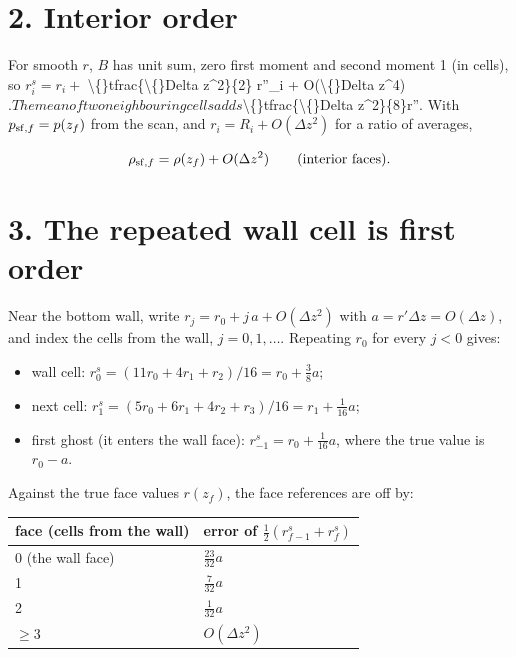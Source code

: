 \documentclass[11pt,a4paper]{article}
\begin{document}
\section*{2. Interior order}

For smooth $r$, $B$ has unit sum, zero first moment and second moment 1 (in cells), so $r^s_i = r_i +$
\textbackslash\{\}tfrac\{\textbackslash\{\}Delta z\textasciicircum{}2\}\{2\} r''\_i + O(\textbackslash\{\}Delta z\textasciicircum{}4)$. The mean of two neighbouring cells adds $\textbackslash\{\}tfrac\{\textbackslash\{\}Delta z\textasciicircum{}2\}\{8\}r''$.$
With $p_{{\rm sf},f} = p(z_f)$ from the scan, and $r_i = R_i + O(\Delta z^2)$ for a ratio of averages,

\begin{equation*}
\rho_{{\rm sf},f} = \rho(z_f) + O(\Delta z^2)\qquad\text{(interior faces)}.
\end{equation*}

\section*{3. The repeated wall cell is first order}

Near the bottom wall, write $r_j = r_0 + j\,a + O(\Delta z^2)$ with $a = r'\Delta z = O(\Delta z)$, and index the
cells from the wall, $j = 0, 1, \dots$. Repeating $r_0$ for every $j < 0$ gives:

\begin{itemize}
\item wall cell: $r^s_0 = (11 r_0 + 4 r_1 + r_2)/16 = r_0 + \tfrac{3}{8}a$;
\item next cell: $r^s_1 = (5 r_0 + 6 r_1 + 4 r_2 + r_3)/16 = r_1 + \tfrac{1}{16}a$;
\item first ghost (it enters the wall face): $r^s_{-1} = r_0 + \tfrac{1}{16}a$, where the true value is $r_0 - a$.
\end{itemize}

Against the true face values $r(z_f)$, the face references are off by:

\begin{longtable}{ll}
\toprule
face (cells from the wall) & error of $\tfrac12(r^s_{f-1}+r^s_f)$ \\
\midrule
0 (the wall face) & $\tfrac{23}{32}a$ \\
1 & $\tfrac{7}{32}a$ \\
2 & $\tfrac{1}{32}a$ \\
$\ge 3$ & $O(\Delta z^2)$ \\
\bottomrule
\end{longtable}
\end{document}

